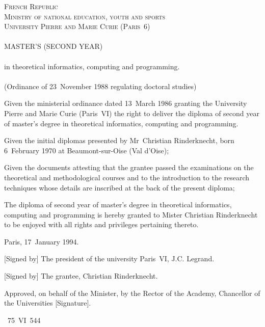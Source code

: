 \documentclass[a4paper,11pt,twoside]{article}
\begin{document}
\pagestyle{empty}

\begin{center}
\textsc{French Republic}\\
\textsc{Ministry of national education, youth and sports}\\
\textsc{University Pierre and Marie Curie (Paris~6)}\\
\ \\
\textsc{\Large MASTER'S (SECOND YEAR)}\\
\ \\
in theoretical informatics, computing and programming.\\
\ \\
(Ordinance of 23~November 1988 regulating doctoral studies)
\end{center}
Given the ministerial ordinance dated 13~March 1986 granting the
University Pierre and Marie Curie (Paris~VI) the right to deliver the
diploma of second year of master's degree in theoretical informatics,
computing and programming.

\medskip

Given the initial diplomas presented by Mr~Christian Rinderknecht,
born 6~February 1970 at Beaumont-sur-Oise (Val d'Oise);

\medskip

Given the documents attesting that the grantee passed the examinations
on the theoretical and methodological courses and to the introduction
to the research techniques whose details are inscribed at the back of
the present diploma;

\medskip

The diploma of second year of master's degree in theoretical
informatics, computing and programming is hereby granted to Mister
Christian Rinderknecht to be enjoyed with all rights and privileges
pertaining thereto.

\bigskip

Paris, 17~January 1994.

\bigskip

[Signed by] The president of the university Paris~VI, J.C. Legrand.

[Signed by] The grantee, Christian Rinderknecht.

Approved, on behalf of the Minister, by the Rector of the Academy,
Chancellor of the Universities [Signature].

\bigskip

\hfill\textnumero~75~VI~544

\newpage
\end{document}
